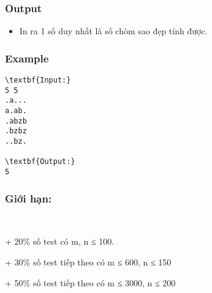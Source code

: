 \subsubsection{Output}
\begin{itemize}
	\item In ra 1 số duy nhất là số chòm sao đẹp tính được.
\end{itemize}

\subsubsection{Example}
\begin{verbatim}
\textbf{Input:}
5 5
.a...
a.ab.
.abzb
.bzbz
..bz.

\textbf{Output:}
5
\end{verbatim}

\subsubsection{Giới hạn:}

 

+ 20\% số test có m, n ≤ 100.

+ 30\% số test tiếp theo có m ≤ 600, n ≤ 150

+ 50\% số test tiếp theo có m ≤ 3000, n ≤ 200 \textbf{}
